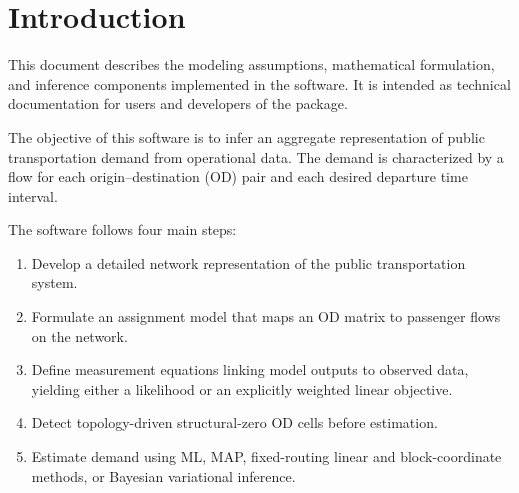 \section{Introduction}

This document describes the modeling assumptions, mathematical formulation, and inference components implemented in the software. It is intended as technical documentation for users and developers of the package.

The objective of this software is to infer an aggregate representation of public transportation demand from operational data. The demand is characterized by a flow for each origin--destination (OD) pair and each desired departure time interval.

The software follows four main steps:
\begin{enumerate}
\item Develop a detailed network representation of the public transportation system.
\item Formulate an assignment model that maps an OD matrix to passenger flows on the network.
\item Define measurement equations linking model outputs to observed data,
yielding either a likelihood or an explicitly weighted linear objective.
\item Detect topology-driven structural-zero OD cells before estimation.
\item Estimate demand using ML, MAP, fixed-routing linear and block-coordinate
methods, or Bayesian variational inference.
\end{enumerate}

